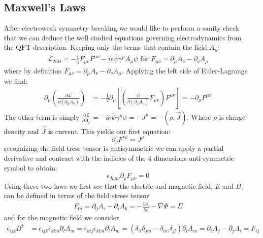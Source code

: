\subsection{Maxwell's Laws} 

After electroweak symmetry breaking we would like to perform a sanity check that we can deduce the well studied
 equations governing electrodynamics from the QFT description. Keeping only the terms that contain the field $A_\mu$:
\begin{align*}
\mathcal{L}_{EM} = -\frac{1}{4} F_{\mu\nu} F^{\mu\nu}  - ie \bar{\psi} \gamma^\mu A_\mu \psi \text{ for } F_{\mu\nu} = \partial_\mu A_\nu - \partial_\nu A_\mu 
\end{align*}
where by definition $F_{\mu\nu} = \partial_\mu A_\nu - \partial_\nu A_\mu$. Applying the left side of Euler-Lagrange we find:
\begin{align*}
\partial_\mu \left (\frac{\partial \mathcal L}{\partial(\partial_\mu A_\nu)} \right) &=  
-\frac{1}{2}\partial_\mu \left [ \left (\frac{\partial}{\partial(\partial_\mu A_\nu)} F_{\mu\nu} \right) F^{\mu\nu} \right ] 
= -  \partial_\mu F^{\mu\nu}
\end{align*}
The other term is simply $\frac{\partial \mathcal L}{\partial A_\mu} = -ie \bar \psi \gamma^\mu  \psi = - J^\mu = -(\rho, \vec J)$. Where $\rho$ is charge
density and $\vec J$ is current. This yields our first equation:
\begin{equation}
\partial_\nu F^{\nu\mu} = J^\mu
\end{equation}
recognizing the field tress tensor is antisymmetric we can apply a partial derivative and contract with the indicies of the 4 dimensions anti-symmetric symbol
to obtain:
\begin{equation}
\epsilon_{\theta\rho\mu\nu} \partial_{\rho} F_{\mu\nu} = 0 
\end{equation}
Using these two laws we first see that the electric and magnetic field, $E$ and $B$, can be
defined in terms of the field stress tensor
\begin{align*}
F_{0i} = \partial_0 A_i - \partial_i A_0 = -\frac{\partial A}{\partial t} - \nabla \Phi = E
\end{align*}
and for the magnetic field we consider 
\begin{align*}
\epsilon_{ijk}B^k &= \epsilon_{ijk} \epsilon_{klm} \partial_l A_m = \epsilon_{kij} \epsilon_{klm} \partial_l A_m = (\delta_{il} \delta_{jm} - \delta_{im}\delta_{jl}) \partial_l A_m = \partial_i A_j - \partial_j A_i = F_{ij}
\end{align*}

